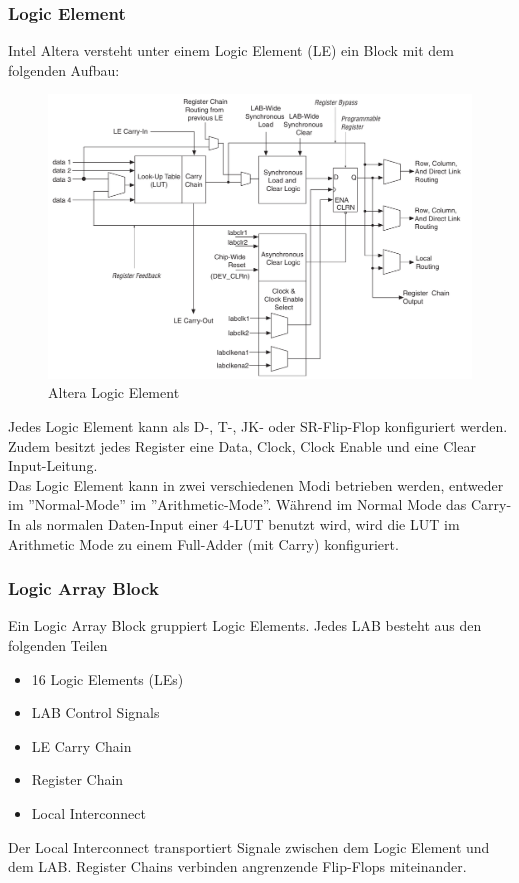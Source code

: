 \documentclass[11pt,a4paper,oneside]{scrartcl}
\begin{document}
\subsubsection{Logic Element}
Intel Altera versteht unter einem Logic Element (LE) ein Block mit dem folgenden Aufbau:
\begin{figure}[h!]
\centering
\includegraphics[width=13cm]{pic/logicelement.png}
\caption{Altera Logic Element}
\end{figure}

Jedes Logic Element kann als D-, T-, JK- oder SR-Flip-Flop konfiguriert werden. Zudem besitzt jedes Register eine Data, Clock, Clock Enable und eine Clear Input-Leitung. \\
Das Logic Element kann in zwei verschiedenen Modi betrieben werden, entweder im ''Normal-Mode'' im ''Arithmetic-Mode''. Während im Normal Mode das Carry-In als normalen Daten-Input einer 4-LUT benutzt wird, wird die LUT im Arithmetic Mode zu einem Full-Adder (mit Carry) konfiguriert. 
\subsubsection{Logic Array Block}
Ein Logic Array Block gruppiert Logic Elements. Jedes LAB besteht aus den folgenden Teilen
\begin{itemize}
\item 16 Logic Elements (LEs)
\item LAB Control Signals
\item LE Carry Chain
\item Register Chain
\item Local Interconnect
\end{itemize}
Der Local Interconnect transportiert Signale zwischen dem Logic Element und dem LAB. Register Chains verbinden angrenzende Flip-Flops miteinander. 
\end{document}
